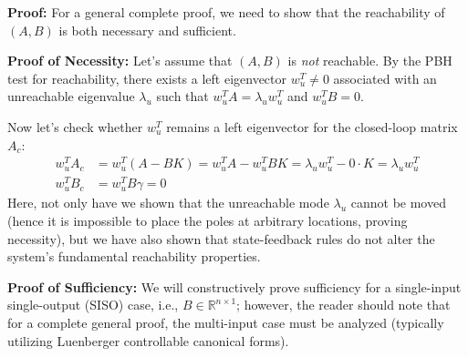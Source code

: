 \documentclass[twoside, 11pt, a4paper]{article}
\begin{document}
\textbf{Proof:} For a general complete proof, we need to show that the reachability of $(A,B)$ is both necessary and sufficient. 

\textbf{Proof of Necessity:} Let's assume that $(A,B)$ is \textit{not} reachable. By the PBH test for reachability, there exists a left eigenvector $w_u^T \neq 0$ associated with an unreachable eigenvalue $\lambda_u$ such that
$w_u^T A = \lambda_u w_u^T $ and $w_u^T B = 0$. 

Now let's check whether $w_u^T$ remains a left eigenvector for the closed-loop matrix $A_c$:
%
\begin{align*}
	w_u^T A_c &= w_u^T (A - B K ) = w_u^T A - w_u^T B K = \lambda_u w_u^T - 0 \cdot K = \lambda_u w_u^T
	\\
	w_u^T B_c &= w_u^T B \gamma = 0
\end{align*} 
%
Here, not only have we shown that the unreachable mode $\lambda_u$ cannot be moved (hence it is impossible to place the poles at arbitrary locations, proving necessity), but we have also shown that state-feedback rules do not alter the system's fundamental reachability properties.

\textbf{Proof of Sufficiency:} We will constructively prove sufficiency for a single-input single-output (SISO) case, i.e., $B \in \mathbb{R}^{n \times 1}$; however, the reader should note that for a complete general proof, the multi-input case must be analyzed (typically utilizing Luenberger controllable canonical forms). 
\end{document}
